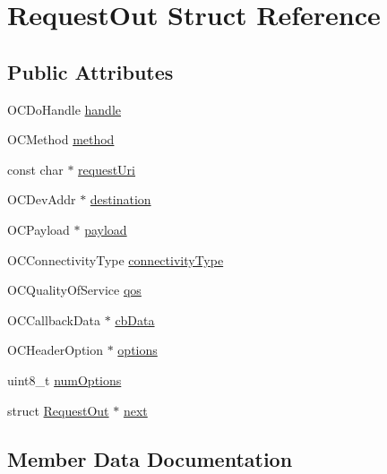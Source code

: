 \hypertarget{struct_request_out}{}\section{Request\+Out Struct Reference}
\label{struct_request_out}
\subsection*{Public Attributes}
\begin{DoxyCompactItemize}
\item 
O\+C\+Do\+Handle \hyperlink{struct_request_out_a37e7f41a35721d5525cd1b68e5dc4690}{handle}
\item 
O\+C\+Method \hyperlink{struct_request_out_a7a8c0fad40c816c2ccfadeae5f598dce}{method}
\item 
const char $\ast$ \hyperlink{struct_request_out_a1c7a4613c9332658740ca98f33313ff3}{request\+Uri}
\item 
O\+C\+Dev\+Addr $\ast$ \hyperlink{struct_request_out_ab71b7738ea6f781f3403de9b4fc2d459}{destination}
\item 
O\+C\+Payload $\ast$ \hyperlink{struct_request_out_a39145cad7d7a6732d098a907c9ad745c}{payload}
\item 
O\+C\+Connectivity\+Type \hyperlink{struct_request_out_aabcaf8e6e1918ddcd8977d4925f2721a}{connectivity\+Type}
\item 
O\+C\+Quality\+Of\+Service \hyperlink{struct_request_out_adac9861e9a95ece1b7dcf860f9df4e95}{qos}
\item 
O\+C\+Callback\+Data $\ast$ \hyperlink{struct_request_out_a39f0816a294c75688c9d4edea9cad926}{cb\+Data}
\item 
O\+C\+Header\+Option $\ast$ \hyperlink{struct_request_out_a4dcfc3ac32de5eda001be32ed6912c68}{options}
\item 
uint8\+\_\+t \hyperlink{struct_request_out_aa761589b7155d44791458d884faeeee8}{num\+Options}
\item 
struct \hyperlink{struct_request_out}{Request\+Out} $\ast$ \hyperlink{struct_request_out_ae6b5027e17598a7dfd6ac08303bddfed}{next}
\end{DoxyCompactItemize}


\subsection{Member Data Documentation}
\hypertarget{struct_request_out_a39f0816a294c75688c9d4edea9cad926}{}\label{struct_request_out_a39f0816a294c75688c9d4edea9cad926} 

